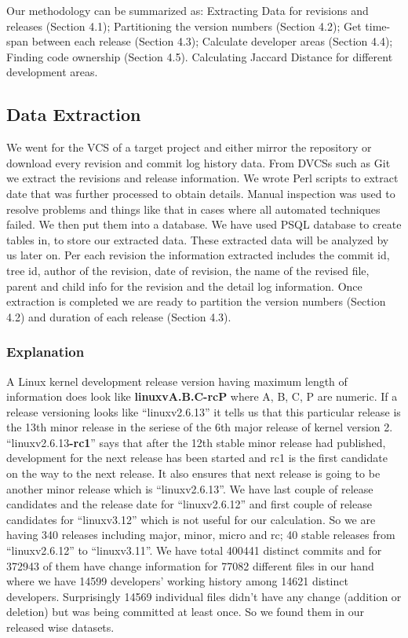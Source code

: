 \documentclass{acm_proc_article-sp}
\begin{document}
Our methodology can be summarized as: Extracting Data for revisions and releases (Section 4.1); Partitioning the version numbers (Section 4.2); Get time-span between each release (Section 4.3); Calculate developer areas (Section 4.4); Finding code ownership (Section 4.5). Calculating Jaccard Distance for different development areas.

\subsection{Data Extraction}
We went for the VCS of a target project and either mirror the repository or download every revision and commit log history data. From DVCSs such as Git we extract the revisions and release information. We wrote Perl scripts to extract date that was further processed to obtain details. Manual inspection was used to resolve problems and things like that in cases where all automated techniques failed.
We then put them into a database. We have used PSQL database to create tables in, to store our extracted data. These extracted data will be analyzed by us later on. Per each revision the information extracted includes the commit id, tree id, author of the revision, date of revision, the name of the revised file, parent and child info for the revision and the detail log information. Once extraction is completed we are ready to partition the version numbers (Section 4.2) and duration  of each release (Section 4.3).

\subsubsection{Explanation}
A Linux kernel development release version having maximum length of information does look like \textbf{linuxvA.B.C-rcP} where A, B, C, P are numeric. If a release versioning looks like ``linuxv2.6.13'' it tells us that this particular release is the 13th minor release  in the seriese of the 6th major release of kernel version 2. ``linuxv2.6.13\textbf{-rc1}'' says that after the 12th stable minor release had published, development for the next release has been started and rc1 is the first candidate on the way to the next release. It also ensures that next release is going to be another minor release which is ``linuxv2.6.13''. We have last couple of release candidates and the release date for ``linuxv2.6.12'' and first couple of release candidates for ``linuxv3.12'' which is not useful for our calculation. So we are having 340 releases including major, minor, micro and rc; 40 stable releases from ``linuxv2.6.12'' to ``linuxv3.11''. We have total 400441 distinct commits and for 372943 of them have change information for 77082 different files in our hand where we have 14599 developers' working history among 14621 distinct developers.
Surprisingly 14569 individual files didn't have any change (addition or deletion) but was being committed at least once. So we found them in our released wise datasets.
\end{document}
